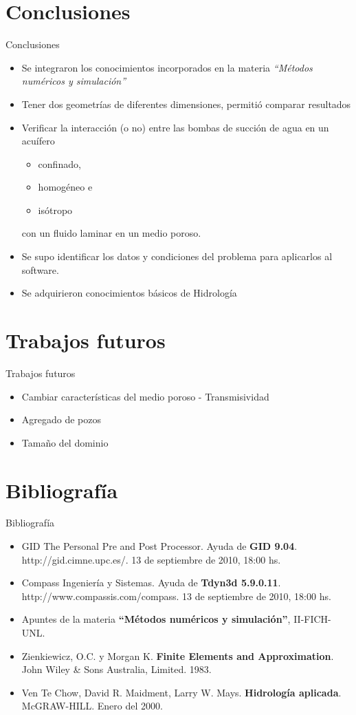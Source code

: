 \documentclass[spanish]{beamer}
\begin{document}
\section{Conclusiones}
\begin{frame}{Conclusiones}
\begin{itemize}
\item Se integraron los conocimientos incorporados en la materia \emph{``Métodos numéricos y simulación''}
\item Tener dos geometrías de diferentes dimensiones, permitió comparar resultados
\item Verificar la interacción (o no) entre las bombas de succión de agua en un acuífero 
\begin{itemize}
\item confinado, 
\item homogéneo e 
\item isótropo
\end{itemize}
con un fluido laminar en un  medio poroso.
\item Se supo identificar los datos y condiciones del problema para aplicarlos al software.
\item Se adquirieron conocimientos básicos de Hidrología
\end{itemize}
\end{frame}
%
\section{Trabajos futuros}
\begin{frame}{Trabajos futuros}
  \begin{itemize}
  \item Cambiar características del medio poroso - Transmisividad
  \item Agregado de pozos
  \item Tamaño del dominio
  \end{itemize}
\end{frame}
\section{Bibliografía}
\begin{frame}{Bibliografía}
  \begin{itemize}
  \item GID The Personal Pre and Post Processor. Ayuda de \textbf{GID 9.04}. http://gid.cimne.upc.es/. 13 de septiembre de 2010, 18:00 hs. 
  \item Compass Ingeniería y Sistemas. Ayuda de \textbf{Tdyn3d 5.9.0.11}. http://www.compassis.com/compass. 13 de septiembre de 2010, 18:00 hs.
  \item Apuntes de la materia \textbf{``Métodos numéricos y simulación''}, II-FICH-UNL.
  \item Zienkiewicz,  O.C. y Morgan K. \textbf{Finite Elements and Approximation}. John Wiley \& Sons Australia, Limited. 1983.
  \item Ven Te Chow, David R. Maidment, Larry W. Mays. \textbf{Hidrología aplicada}. McGRAW-HILL. Enero del 2000.
 \end{itemize}
\end{frame}
\end{document}
